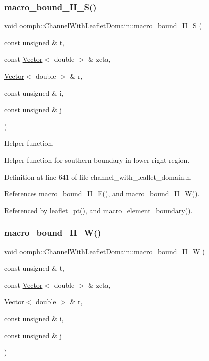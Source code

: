 \subsubsection{\texorpdfstring{macro\+\_\+bound\+\_\+\+I\+I\+\_\+\+S()}{macro\_bound\_II\_S()}}
{\footnotesize\ttfamily void oomph\+::\+Channel\+With\+Leaflet\+Domain\+::macro\+\_\+bound\+\_\+\+I\+I\+\_\+S (\begin{DoxyParamCaption}\item[{const unsigned \&}]{t,  }\item[{const \hyperlink{classoomph_1_1Vector}{Vector}$<$ double $>$ \&}]{zeta,  }\item[{\hyperlink{classoomph_1_1Vector}{Vector}$<$ double $>$ \&}]{r,  }\item[{const unsigned \&}]{i,  }\item[{const unsigned \&}]{j }\end{DoxyParamCaption})\hspace{0.3cm}{\ttfamily [protected]}}



Helper function. 

Helper function for southern boundary in lower right region. 

Definition at line 641 of file channel\+\_\+with\+\_\+leaflet\+\_\+domain.\+h.



References macro\+\_\+bound\+\_\+\+I\+I\+\_\+\+E(), and macro\+\_\+bound\+\_\+\+I\+I\+\_\+\+W().



Referenced by leaflet\+\_\+pt(), and macro\+\_\+element\+\_\+boundary().

\mbox{\label{classoomph_1_1ChannelWithLeafletDomain_afa35af75e7a60d3e5d4adf6a8097825e}} 
\subsubsection{\texorpdfstring{macro\+\_\+bound\+\_\+\+I\+I\+\_\+\+W()}{macro\_bound\_II\_W()}}
{\footnotesize\ttfamily void oomph\+::\+Channel\+With\+Leaflet\+Domain\+::macro\+\_\+bound\+\_\+\+I\+I\+\_\+W (\begin{DoxyParamCaption}\item[{const unsigned \&}]{t,  }\item[{const \hyperlink{classoomph_1_1Vector}{Vector}$<$ double $>$ \&}]{zeta,  }\item[{\hyperlink{classoomph_1_1Vector}{Vector}$<$ double $>$ \&}]{r,  }\item[{const unsigned \&}]{i,  }\item[{const unsigned \&}]{j }\end{DoxyParamCaption})\hspace{0.3cm}{\ttfamily [protected]}}



